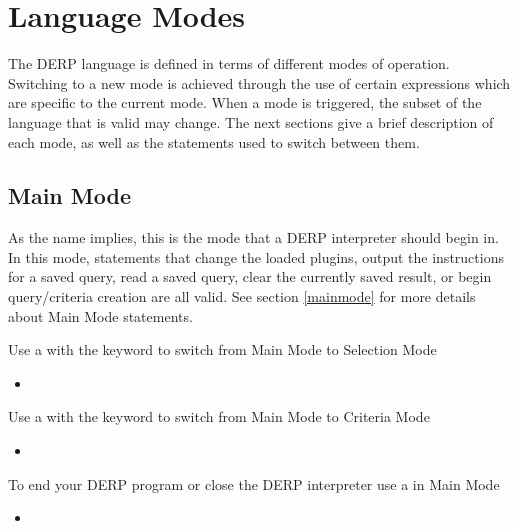 \section{Language Modes}

The DERP language is defined in terms of different modes of operation.
Switching to a new mode is achieved through the use of certain expressions
which are specific to the current mode. When a mode is triggered, the
subset of the language that is valid may change. The next sections give
a brief description of each mode, as well as the statements used to switch between them.


\subsection{Main Mode}

As the name implies, this is the mode that a DERP interpreter should begin in. In this mode,
statements that change the loaded plugins, output the instructions for a saved query, read a
saved query, clear the currently saved result, or begin query/criteria creation are all valid.
See section \ref{mainmode} for more details about Main Mode statements.

Use a  with the  keyword to switch from Main Mode to Selection Mode
\begin{itemize}[leftmargin=2in]
    \item[\nonterminal{create\_expression}] \bnf{:}    
\end{itemize}

Use a  with the  keyword to switch from Main Mode to Criteria Mode
\begin{itemize}[leftmargin=2in]
    \item[\nonterminal{create\_expression}] \bnf{:}    
\end{itemize}

To end your DERP program or close the DERP interpreter use a  in Main Mode
\begin{itemize}[leftmargin=2in]
    \item[\nonterminal{stop\_expression}] \bnf{:}  \bnf{|} 
\end{itemize}


